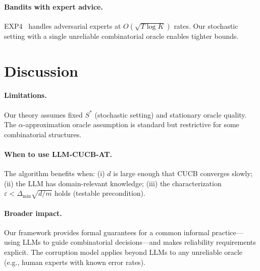 \documentclass{article}
\newcommand{\Sstar}{S^{*}}
\begin{document}
\paragraph{Bandits with expert advice.}
EXP4~\citep{auer2002nonstochastic} handles adversarial experts at $O(\sqrt{T\log K})$ rates.
Our stochastic setting with a single unreliable combinatorial oracle enables tighter bounds.

\section{Discussion}
\label{sec:discussion}

\paragraph{Limitations.}
Our theory assumes fixed $\Sstar$ (stochastic setting) and stationary oracle quality.
The $\alpha$-approximation oracle assumption is standard but restrictive for some combinatorial structures.

\paragraph{When to use LLM-CUCB-AT.}
The algorithm benefits when: (i) $d$ is large enough that CUCB converges slowly; (ii) the LLM has domain-relevant knowledge; (iii) the characterization $\varepsilon < \Delta_{\min}\sqrt{d/m}$ holds (testable precondition).

\paragraph{Broader impact.}
Our framework provides formal guarantees for a common informal practice---using LLMs to guide combinatorial decisions---and makes reliability requirements explicit.
The corruption model applies beyond LLMs to any unreliable oracle (e.g., human experts with known error rates).



\end{document}
